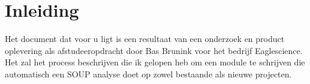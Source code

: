 \chapter{Inleiding} %

\label{ch:Inleiding} %
Het document dat voor u ligt is een resultaat van een onderzoek en product oplevering als afstudeeropdracht door Bas Brunink voor het bedrijf Eaglescience. Het zal het process beschrijven die ik gelopen heb om een module te schrijven die automatisch een SOUP analyse doet op zowel bestaande als nieuwe projecten. 